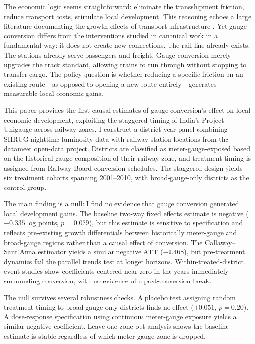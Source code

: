 \documentclass[12pt]{article}
\begin{document}
The economic logic seems straightforward: eliminate the transshipment friction, reduce transport costs, stimulate local development. This reasoning echoes a large literature documenting the growth effects of transport infrastructure \citep{donaldson2018railroads, asher2020rural, ahlfeldt2015economics, baum2020transport, redding2017quantitative}. Yet gauge conversion differs from the interventions studied in canonical work in a fundamental way: it does not create new connections. The rail line already exists. The stations already serve passengers and freight. Gauge conversion merely upgrades the track standard, allowing trains to run through without stopping to transfer cargo. The policy question is whether reducing a specific friction on an existing route---as opposed to opening a new route entirely---generates measurable local economic gains.

This paper provides the first causal estimates of gauge conversion's effect on local economic development, exploiting the staggered timing of India's Project Unigauge across railway zones. I construct a district-year panel combining SHRUG nighttime luminosity data \citep{asher2021shrug} with railway station locations from the datameet open-data project. Districts are classified as meter-gauge-exposed based on the historical gauge composition of their railway zone, and treatment timing is assigned from Railway Board conversion schedules. The staggered design yields six treatment cohorts spanning 2001--2010, with broad-gauge-only districts as the control group.

The main finding is a null: I find no evidence that gauge conversion generated local development gains. The baseline two-way fixed effects estimate is negative ($-0.335$ log points, $p = 0.039$), but this estimate is sensitive to specification and reflects pre-existing growth differentials between historically meter-gauge and broad-gauge regions rather than a causal effect of conversion. The Callaway--Sant'Anna estimator \citep{callaway2021difference} yields a similar negative ATT ($-0.468$), but pre-treatment dynamics fail the parallel trends test at longer horizons. Within-treated-district event studies show coefficients centered near zero in the years immediately surrounding conversion, with no evidence of a post-conversion break.

The null survives several robustness checks. A placebo test assigning random treatment timing to broad-gauge-only districts finds no effect ($+0.051$, $p = 0.20$). A dose-response specification using continuous meter-gauge exposure yields a similar negative coefficient. Leave-one-zone-out analysis shows the baseline estimate is stable regardless of which meter-gauge zone is dropped.
\end{document}
